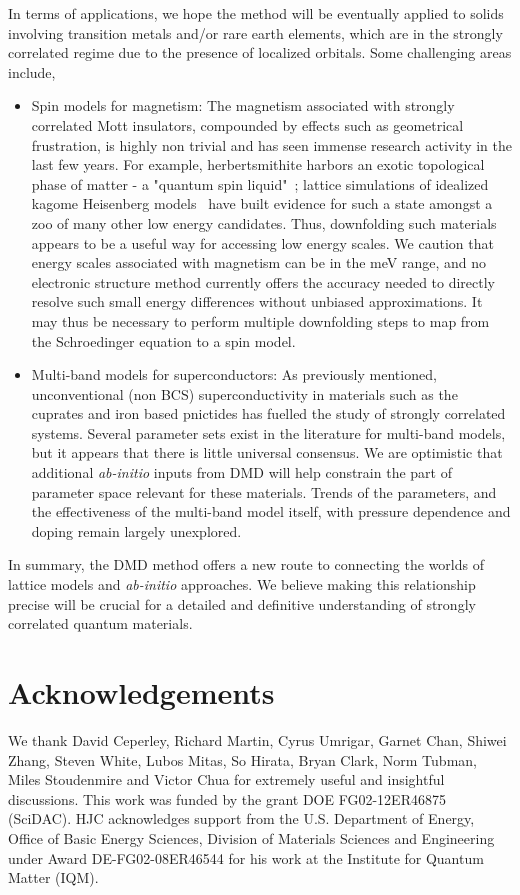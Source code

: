 In terms of applications, we hope the method will be eventually applied to solids involving transition 
metals and/or rare earth elements, which are in the strongly correlated regime due to the presence of localized orbitals. 
Some challenging areas include,
\begin{itemize} 
	\item Spin models for magnetism: 
	The magnetism associated with strongly correlated Mott insulators, compounded by effects such as geometrical frustration, 
	is highly non trivial and has seen immense research activity in the last few years. 
	For example, herbertsmithite harbors an exotic topological phase of matter - a "quantum spin liquid"~\cite{NormanRMP}; 
	lattice simulations of idealized kagome Heisenberg models~\cite{Yan_Huse_White, Changlani_kagome} have built evidence 
	for such a state amongst a zoo of many other low energy candidates. Thus, 
	downfolding such materials~\cite{Jeschke2013} appears to be a useful way for accessing low energy scales. 
	We caution that energy scales associated with magnetism can be in the meV range, and no electronic structure 
	method currently offers the accuracy needed to directly resolve such small energy differences without unbiased approximations. 
	It may thus be necessary to perform multiple downfolding steps to map from the Schroedinger equation to a spin model.
	\item Multi-band models for superconductors:
	As previously mentioned, unconventional (non BCS) superconductivity in materials such as the cuprates and iron based 
	pnictides has fuelled the study of strongly correlated systems.
	Several parameter sets exist in the literature for multi-band models, but it appears that there is little universal consensus. 
	We are optimistic that additional \textit{ab-initio} inputs from DMD will help constrain the part of parameter 
	space relevant for these materials. Trends of the parameters, and the effectiveness of the multi-band model itself, 
	with pressure dependence and doping remain largely unexplored.  
\end{itemize} 
In summary, the DMD method offers a new route to connecting the worlds of lattice models and \textit{ab-initio} approaches. 
We believe making this relationship precise will be crucial for a detailed and definitive 
understanding of strongly correlated quantum materials. 

\section{Acknowledgements} 
We thank  David Ceperley,  Richard Martin, Cyrus Umrigar,  Garnet Chan,  Shiwei Zhang, Steven White,  
Lubos Mitas, So Hirata, Bryan Clark, Norm Tubman, Miles Stoudenmire and Victor Chua for extremely useful and insightful discussions. 
This work was funded by the grant DOE FG02-12ER46875 (SciDAC). HJC acknowledges support from the U.S. Department of Energy, 
Office of Basic Energy Sciences, Division of Materials Sciences and Engineering under Award DE-FG02-08ER46544 for his work at the Institute for Quantum Matter (IQM). 


